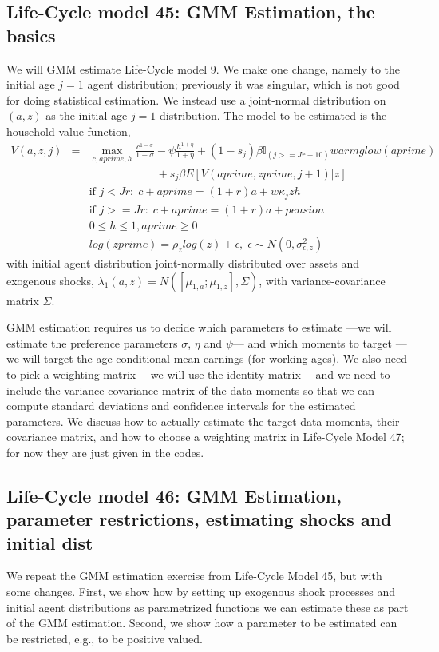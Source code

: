 \subsection{Life-Cycle model 45: GMM Estimation, the basics}
We will GMM estimate Life-Cycle model 9. We make one change, namely to the initial age $j=1$ agent distribution; previously it was singular, which is not good for doing statistical estimation. We instead use a joint-normal distribution on $(a,z)$ as the initial age $j=1$ distribution. The model to be estimated is the household value function,
\begin{eqnarray*}
 V(a,z,j)&=& \max_{c,aprime,h} \frac{c^{1-\sigma}}{1-\sigma} - \psi \frac{h^{1+\eta}}{1+\eta} + (1-s_j)\beta  \mathbb{I}_{(j>=Jr+10)} warmglow(aprime)    \\
 && \quad \quad \quad \quad \quad \quad  + s_j \beta E[V(aprime,zprime,j+1)|z] \\
&& \text{if }j<Jr: \; c+aprime=(1+r)a+w \kappa_j z h\\
&& \text{if }j>=Jr: \; c+aprime=(1+r)a +pension\\
&& 0\leq h \leq 1, aprime\geq 0 \\
&& log(zprime)=\rho_z log(z) + \epsilon, \; \epsilon \sim N(0,\sigma_{\epsilon,z}^2)
\end{eqnarray*}
with initial agent distribution joint-normally distributed over assets and exogenous shocks, $\lambda_1(a,z)=N([\mu_{1,a};\mu_{1,z}],\Sigma)$, with variance-covariance matrix $\Sigma$.

GMM estimation requires us to decide which parameters to estimate ---we will estimate the preference parameters $\sigma$, $\eta$ and $\psi$--- and which moments to target ---we will target the age-conditional mean earnings (for working ages). We also need to pick a weighting matrix ---we will use the identity matrix--- and we need to include the variance-covariance matrix of the data moments so that we can compute standard deviations and confidence intervals for the estimated parameters. We discuss how to actually estimate the target data moments, their covariance matrix, and how to choose a weighting matrix in Life-Cycle Model 47; for now they are just given in the codes.


\subsection{Life-Cycle model 46: GMM Estimation, parameter restrictions, estimating shocks and initial dist}
We repeat the GMM estimation exercise from Life-Cycle Model 45, but with some changes. First, we show how by setting up exogenous shock processes and initial agent distributions as parametrized functions we can estimate these as part of the GMM estimation. Second, we show how a parameter to be estimated can be restricted, e.g., to be positive valued.

